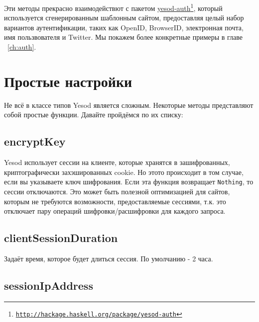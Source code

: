 Эти методы прекрасно взаимодействют с пакетом \href{http://hackage.haskell.org/package/yesod-auth}{yesod-auth}\footnote{\href{http://hackage.haskell.org/package/yesod-auth}{\texttt{http://hackage.haskell.org/package/yesod-auth}}}, который используется сгенерированным шаблонным сайтом, предоставляя целый набор вариантов аутентификации, таких как OpenID, BrowserID, электронная почта, имя пользвователя и Twitter. Мы покажем более конкретные примеры в главе ~\ref{ch:auth}.

\section {Простые настройки}

Не всё в классе типов Yesod является сложным. Некоторые методы представляют собой простые функции. Давайте пройдёмся по их списку:

\subsection {encryptKey}

Yesod использует сессии на клиенте, которые хранятся в зашифрованных, криптографически захэшированных cookie. Но этото происходит в том случае, если вы указываете ключ шифрования. Если эта функция возвращает \lstinline!Nothing!, то сессии отключаются. Это может быть полезной оптимизацией для сайтов, которым не требуются возможности, предоставляемые сессиями, т.к. это отключает пару операций шифровки/расшифровки для каждого запроса.


\subsection {clientSessionDuration}

Задаёт время, которое будет длиться сессия. По умолчанию - 2 часа.

\subsection {sessionIpAddress}

